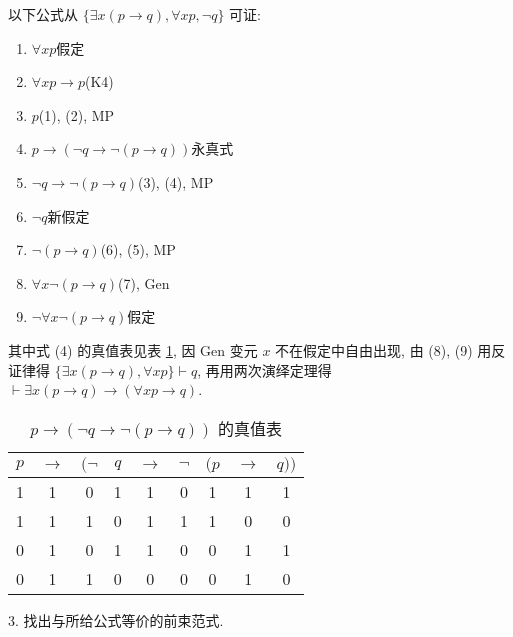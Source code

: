 \documentclass[boxes]{homework}
\begin{document}
\begin{solution}
    以下公式从 $\{\exists x(p\to q), \forall xp, \lnot q\}$ 可证:
    \begin{enumerate}[label = (\arabic*), itemsep = 0em, topsep = .5em, partopsep = .5em]
        \item $\forall xp$\hfill 假定
        \item $\forall xp \to p$\hfill (K4)
        \item $p$\hfill (1), (2), MP
        \item $p\to (\lnot q\to \lnot (p\to q))$\hfill 永真式
        \item $\lnot q\to\lnot (p\to q)$\hfill (3), (4), MP
        \item $\lnot q$\hfill 新假定
        \item $\lnot (p\to q)$\hfill (6), (5), MP
        \item $\forall x\lnot (p\to q)$\hfill (7), Gen
        \item $\lnot \forall x\lnot (p\to q)$\hfill 假定
    \end{enumerate}
    其中式 (4) 的真值表见表 \ref{tab:16.1.2}, 因 Gen 变元 $x$ 不在假定中自由出现, 由 (8), (9) 用反证律得 $\{\exists x(p\to q), \forall xp\}\vdash q$, 再用两次演绎定理得 $\vdash \exists x(p\to q)\to (\forall xp\to q)$.
    \begin{table}[!htbp]
        \centering
        \caption{$p\to (\lnot q\to \lnot (p\to q))$ 的真值表}
        \label{tab:16.1.2}
        \begin{tabular}{c|c|ccccccc}
            $p$ & $\to$ & $(\lnot$ & $q$ & $\to$ & $\lnot$ & $(p$ & $\to$ & $q))$ \\
            \hline
            1   & 1     & 0        & 1   & 1     & 0       & 1    & 1     & 1     \\
            1   & 1     & 1        & 0   & 1     & 1       & 1    & 0     & 0     \\
            0   & 1     & 0        & 1   & 1     & 0       & 0    & 1     & 1     \\
            0   & 1     & 1        & 0   & 0     & 0       & 0    & 1     & 0     \\
        \end{tabular}
    \end{table}
\end{solution}
\begin{problem}
3. 找出与所给公式等价的前束范式.
\end{problem}
\end{document}
